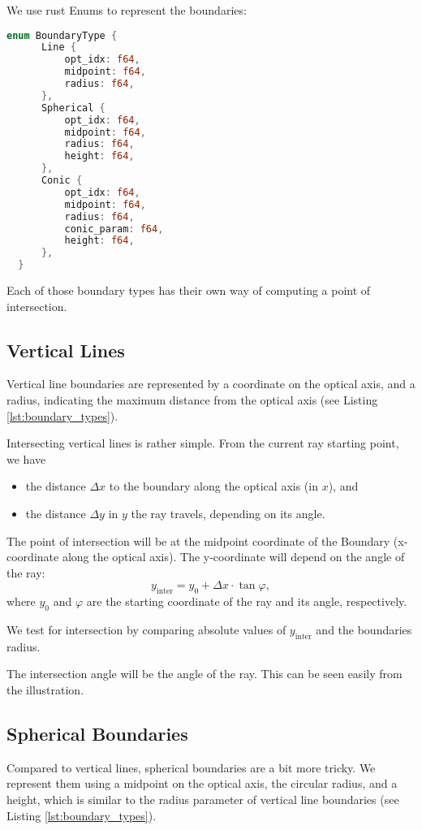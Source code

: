 \documentclass[12pt]{article}
\begin{document}
We use rust Enums to represent the boundaries:
\begin{lstlisting}[caption={Representation of Boundary Types\label{lst:boundary_types}},language=Rust]
  enum BoundaryType {
      Line {
          opt_idx: f64,
          midpoint: f64,
          radius: f64,
      },
      Spherical {
          opt_idx: f64,
          midpoint: f64,
          radius: f64,
          height: f64,
      },
      Conic {
          opt_idx: f64,
          midpoint: f64,
          radius: f64,
          conic_param: f64,
          height: f64,
      },
  }
\end{lstlisting}

Each of those boundary types has their own way of computing a point of intersection.

\clearpage
\subsection{Vertical Lines}
Vertical line boundaries are represented by a coordinate on the optical axis, and a
radius, indicating the maximum distance from the optical axis (see Listing 
\ref{lst:boundary_types}).

Intersecting vertical lines is rather simple. From the current ray starting point, we
have
\begin{itemize}
  \item the distance $\Delta x$ to the boundary along the optical axis (in $x$), and
  \item the distance $\Delta y$ in $y$ the ray travels, depending on its angle.
\end{itemize}
The point of intersection will be at the midpoint coordinate of the Boundary
(x-coordinate along the optical axis). The y-coordinate will depend on the angle of the
ray:
$$y_\text{inter} = y_0 + \Delta x \cdot \tan{\varphi},$$
where $y_0$ and $\varphi$ are the starting coordinate of the ray and its angle,
respectively. 

We test for intersection by comparing absolute values of $y_\text{inter}$ and the
boundaries radius.

The intersection angle will be the angle of the ray. This can be seen easily from the
illustration.


\clearpage
\subsection{Spherical Boundaries}
Compared to vertical lines, spherical boundaries are a bit more tricky. We represent them
using a midpoint on the optical axis, the circular radius, and a height, which is similar
to the radius parameter of vertical line boundaries (see Listing
\ref{lst:boundary_types}).
\end{document}
